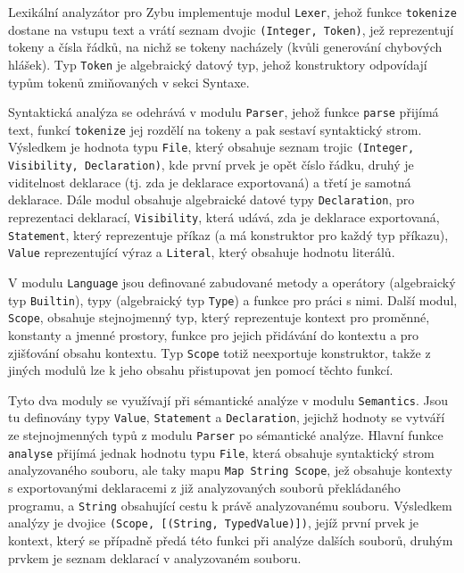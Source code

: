 \documentclass[a4paper,12pt]{article}
\begin{document}
Lexikální analyzátor pro Zybu implementuje modul \texttt{Lexer}, jehož funkce \texttt{tokenize} dostane na vstupu text a vrátí seznam dvojic \texttt{(Integer, Token)}, jež reprezentují tokeny a čísla řádků, na nichž se tokeny nacházely (kvůli generování chybových hlášek). Typ \texttt{Token} je algebraický datový typ, jehož konstruktory odpovídají typům tokenů zmiňovaných v sekci Syntaxe.

Syntaktická analýza se odehrává v modulu \texttt{Parser}, jehož funkce \texttt{parse} přijímá text, funkcí \texttt{tokenize} jej rozdělí na tokeny a pak sestaví syntaktický strom. Výsledkem je hodnota typu \texttt{File}, který obsahuje seznam trojic \texttt{(Integer, Visibility, Declaration)}, kde první prvek je opět číslo řádku, druhý je viditelnost deklarace (tj. zda je deklarace exportovaná) a třetí je samotná deklarace. Dále modul obsahuje algebraické datové typy \texttt{Declaration}, pro reprezentaci deklarací, \texttt{Visibility}, která udává, zda je deklarace exportovaná, \texttt{Statement}, který reprezentuje příkaz (a má konstruktor pro každý typ příkazu), \texttt{Value} reprezentující výraz a \texttt{Literal}, který obsahuje hodnotu literálů.

V modulu \texttt{Language} jsou definované zabudované metody a operátory (algebraický typ \texttt{Builtin}), typy (algebraický typ \texttt{Type}) a funkce pro práci s nimi. Další modul, \texttt{Scope}, obsahuje stejnojmenný typ, který reprezentuje kontext pro proměnné, konstanty a jmenné prostory, funkce pro jejich přidávání do kontextu a pro zjišťování obsahu kontextu. Typ \texttt{Scope} totiž neexportuje konstruktor, takže z jiných modulů lze k jeho obsahu přistupovat jen pomocí těchto funkcí.

Tyto dva moduly se využívají při sémantické analýze v modulu \texttt{Semantics}. Jsou tu definovány typy \texttt{Value}, \texttt{Statement} a \texttt{Declaration}, jejichž hodnoty se vytváří ze stejnojmenných typů z modulu \texttt{Parser} po sémantické analýze. Hlavní funkce \texttt{analyse} přijímá jednak hodnotu typu \texttt{File}, která obsahuje syntaktický strom analyzovaného souboru, ale taky mapu \texttt{Map String Scope}, jež obsahuje kontexty s exportovanými deklaracemi z již analyzovaných souborů překládaného programu, a \texttt{String} obsahující cestu k právě analyzovanému souboru. Výsledkem analýzy je dvojice \texttt{(Scope, [(String, TypedValue)])}, jejíž první prvek je kontext, který se případně předá této funkci při analýze dalších souborů, druhým prvkem je seznam deklarací v analyzovaném souboru.
\end{document}

